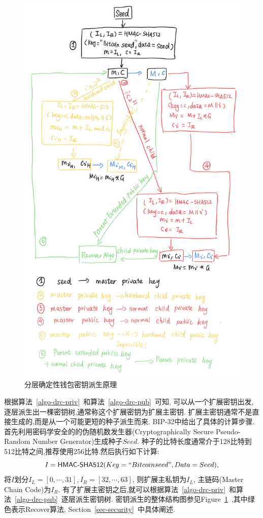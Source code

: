 \begin{figure}
\centering
\includegraphics[width=.7\textwidth]{./outline.png}
\caption{分层确定性钱包密钥派生原理}\label{fig-bip32}
\end{figure}

根据算法~\ref{algo-drc-priv}~和算法~\ref{algo-drc-pub}~可知, 可以从一个扩展密钥出发,
逐层派生出一棵密钥树,通常称这个扩展密钥为扩展主密钥.
扩展主密钥通常不是直接生成的,而是从一个可能更短的种子派生而来.
BIP-32中给出了具体的计算步骤.
首先利用密码学安全的的伪随机数发生器(Cryptographically Secure Pseudo-Random Number Generator)生成种子$Seed$.
种子的比特长度通常介于128比特到512比特之间,推荐使用256比特.然后执行如下计算:
$$I = \textsf{HMAC-SHA512}(Key = ``Bitcoin seed", Data = Seed),$$
将$I$划分$I_L = [0,\cdots,31], I_R = [32,\cdots,63]$,
则扩展主私钥为$I_L$, 主链码(Master Chain Code)为$I_R$.
有了扩展主密钥之后,就可以根据算法~\ref{algo-drc-priv}~和算法~\ref{algo-drc-pub}~逐层派生密钥树.
密钥派生的整体结构图参见Figure~\ref{fig-bip32}~,其中绿色表示Recover算法, Section~\ref{sec-security}~中具体阐述.



